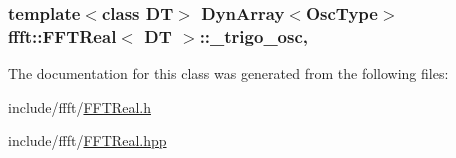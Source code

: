 \subsubsection[{\texorpdfstring{\+\_\+trigo\+\_\+osc}{_trigo_osc}}]{\setlength{\rightskip}{0pt plus 5cm}template$<$class DT$>$ {\bf Dyn\+Array}$<${\bf Osc\+Type}$>$ {\bf ffft\+::\+F\+F\+T\+Real}$<$ DT $>$\+::\+\_\+trigo\+\_\+osc\hspace{0.3cm}{\ttfamily [mutable]}, {\ttfamily [private]}}\hypertarget{classffft_1_1FFTReal_a555f6fccc6ae27c97c96c5a1ddfac971}{}\label{classffft_1_1FFTReal_a555f6fccc6ae27c97c96c5a1ddfac971}


The documentation for this class was generated from the following files\+:\begin{DoxyCompactItemize}
\item 
include/ffft/\hyperlink{FFTReal_8h}{F\+F\+T\+Real.\+h}\item 
include/ffft/\hyperlink{FFTReal_8hpp}{F\+F\+T\+Real.\+hpp}\end{DoxyCompactItemize}
